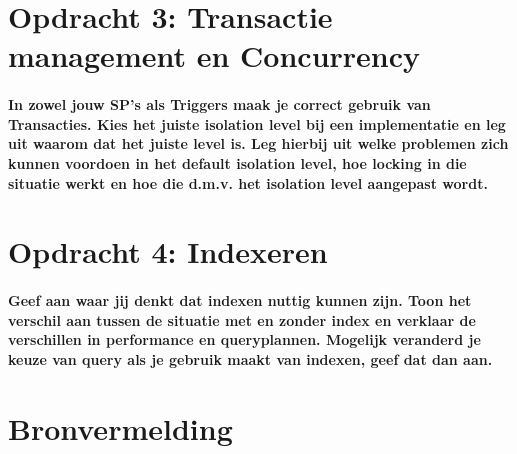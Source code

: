 \documentclass{template/han}
\begin{document}
    \section{Opdracht 3: Transactie management en Concurrency}
    \paragraph{
        In zowel jouw SP's als Triggers maak je correct gebruik van Transacties.
        Kies het juiste isolation level bij een implementatie en leg uit waarom dat het juiste level is.
        Leg hierbij uit welke problemen zich kunnen voordoen in het default isolation level, hoe locking in die situatie werkt en hoe die d.m.v. het isolation level aangepast wordt.
    }
    \label{opdracht3}
    
    \clearpage

    \section{Opdracht 4: Indexeren}
    \paragraph{
        Geef aan waar jij denkt dat indexen nuttig kunnen zijn.
        Toon het verschil aan tussen de situatie met en zonder index en verklaar de verschillen in performance en queryplannen.
        Mogelijk veranderd je keuze van query als je gebruik maakt van indexen, geef dat dan aan.
    }
    \label{opdracht4}
    
    \clearpage

    \newpage
    \section{Bronvermelding}
    \label{bronvermelding}

    \nocite{*}
\end{document}
